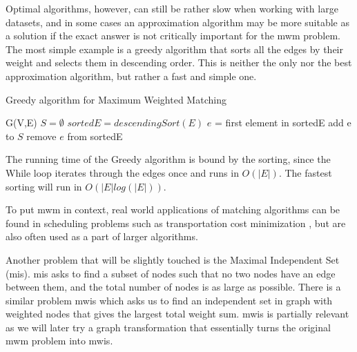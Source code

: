 Optimal algorithms, however, can still be rather slow when working with large datasets, and in some cases an approximation algorithm may be more suitable as a solution if the exact answer is not critically important for the \gls{mwm} problem. The most simple example is a greedy algorithm that sorts all the edges by their weight and selects them in descending order. This is neither the only nor the best approximation algorithm, but rather a fast and simple one.

\begin{algorithm}
\caption{Greedy algorithm for Maximum Weighted Matching}\label{alg:cap}

\begin{algorithmic}
\State G(V,E)
\State $S = \emptyset$
\State $sortedE = descendingSort(E)$
\State $e$ = first element in sortedE
  \State add e to $S$
  \State remove $e$ from sortedE
\EndIf
\EndWhile
\end{algorithmic}
\end{algorithm}

The running time of the Greedy algorithm is bound by the sorting, since the While loop iterates through the edges once and runs in $O(|E|)$. The fastest sorting will run in $O(|E| log(|E|))$.

To put \gls{mwm} in context, real world applications of matching algorithms can be found in scheduling problems such as transportation cost minimization \cite{mwmExample}, but are also often used as a part of larger algorithms.

Another problem that will be slightly touched is the Maximal Independent Set (\gls{mis}). \gls{mis} asks to find a subset of nodes such that no two nodes have an edge between them, and the total number of nodes is as large as possible. There is a similar problem \gls{mwis} which asks us to find an independent set in graph with weighted nodes that gives the largest total weight sum. \gls{mwis} is partially relevant as we will later try a graph transformation that essentially turns the original \gls{mwm} problem into \gls{mwis}.
